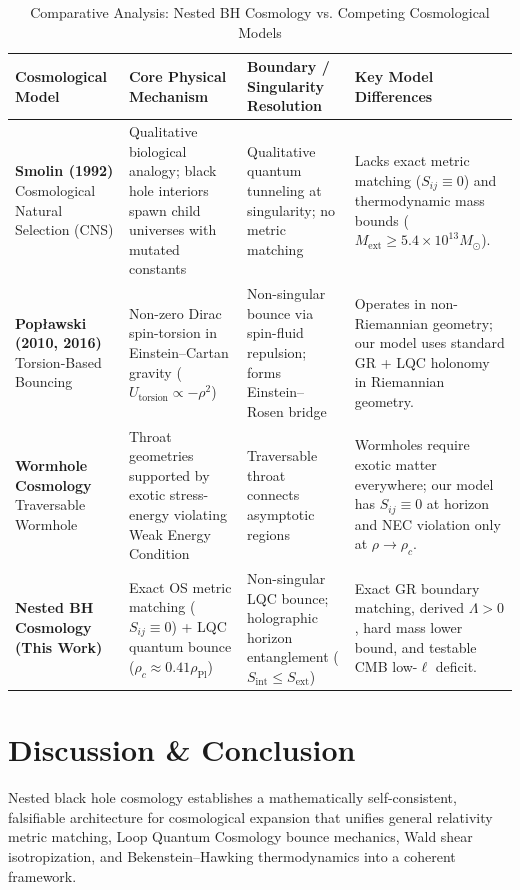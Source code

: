 \documentclass[11pt,a4paper]{article}
\theoremstyle{definition}
\begin{document}
\begin{table}[H]
\centering
\caption{Comparative Analysis: Nested BH Cosmology vs. Competing Cosmological Models}\label{table:competing_models}
\begin{tabular}{p{3.0cm}p{3.6cm}p{4.0cm}p{3.6cm}}
\toprule
\textbf{Cosmological Model} & \textbf{Core Physical Mechanism} & \textbf{Boundary / Singularity Resolution} & \textbf{Key Model Differences} \\
\midrule
\textbf{Smolin (1992) \cite{smolin1992}} Cosmological Natural Selection (CNS) & Qualitative biological analogy; black hole interiors spawn child universes with mutated constants & Qualitative quantum tunneling at singularity; no metric matching & Lacks exact metric matching ($S_{ij} \equiv 0$) and thermodynamic mass bounds ($M_{\text{ext}} \ge 5.4 \times 10^{13} M_\odot$). \\
\midrule
\textbf{Pop\l awski (2010, 2016) \cite{poplawski2010, poplawski2016}} Torsion-Based Bouncing & Non-zero Dirac spin-torsion in Einstein--Cartan gravity ($U_{\text{torsion}} \propto -\rho^2$) & Non-singular bounce via spin-fluid repulsion; forms Einstein--Rosen bridge & Operates in non-Riemannian geometry; our model uses standard GR + LQC holonomy in Riemannian geometry. \\
\midrule
\textbf{Wormhole Cosmology \cite{gaztanaga2022}} Traversable Wormhole & Throat geometries supported by exotic stress-energy violating Weak Energy Condition & Traversable throat connects asymptotic regions & Wormholes require exotic matter everywhere; our model has $S_{ij} \equiv 0$ at horizon and NEC violation only at $\rho \to \rho_c$. \\
\midrule
\textbf{Nested BH Cosmology (This Work)} & Exact OS metric matching ($S_{ij} \equiv 0$) + LQC quantum bounce ($\rho_c \approx 0.41 \rho_{\text{Pl}}$) & Non-singular LQC bounce; holographic horizon entanglement ($S_{\text{int}} \le S_{\text{ext}}$) & Exact GR boundary matching, derived $\Lambda > 0$, hard mass lower bound, and testable CMB low-$\ell$ deficit. \\
\bottomrule
\end{tabular}
\end{table}

\section{Discussion \& Conclusion}\label{sec:conclusion}
Nested black hole cosmology establishes a mathematically self-consistent, falsifiable architecture for cosmological expansion that unifies general relativity metric matching, Loop Quantum Cosmology bounce mechanics, Wald shear isotropization, and Bekenstein--Hawking thermodynamics into a coherent framework.
\end{document}
